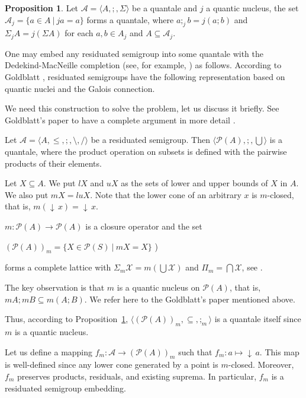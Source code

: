 \documentclass[a4paper]{article}
\theoremstyle{definition}
\theoremstyle{theorem}
\theoremstyle{proposition}
\newtheorem{proposition}{Proposition}
\theoremstyle{lemma}
\theoremstyle{ex}
\theoremstyle{corollary}
\theoremstyle{claim}
\newcommand{\down}[1]{\ensuremath{{\downarrow}\,#1}}
\begin{document}
\begin{proposition} \label{subsemi}
  Let $\mathcal{A} = \langle A, ;, \Sigma \rangle$ be a quantale and $j$ a quantic nucleus, the set
  $\mathcal{A}_j = \{ a \in A \: | \: j a = a \}$ forms a quantale, where $a ;_j b = j(a ; b)$ and $\Sigma_j A = j (\Sigma A)$ for each $a, b \in {A}_j$ and $A \subseteq \mathcal{A}_j$.
\end{proposition}

One may embed any residuated semigroup into some quantale with the Dedekind-MacNeille completion (see, for example, \cite{theunissen2007macneille}) as follows. According to Goldblatt \cite{goldblatt2006kripke}, residuated semigroups have the following representation based on quantic nuclei and the Galois connection.

We need this construction to solve the problem, let us discuss it briefly. See Goldblatt's paper to have a complete argument in more detail \cite{goldblatt2006kripke}.

Let $\mathcal{A} = \langle A, \leq, ;, \setminus, / \rangle$ be a residuated semigroup. Then $\langle \mathcal{P}(A), ;, \bigcup \rangle$ is a quantale, where the product operation on subsets is defined with the pairwise products of their elements.

Let $X \subseteq A$. We put $lX$ and $uX$ as the sets of lower and upper bounds of $X$ in $A$. We also put $m X = lu X$.
Note that the lower cone of an arbitrary $x$ is $m$-closed, that is,
$m (\down{x}) = \down{x}$.

$m : \mathcal{P}(A) \to \mathcal{P}(A)$ is a closure operator and the set

\begin{center}
$(\mathcal{P}(A))_m = \{ X \in \mathcal{P}(S) \: | \: m X = X\}$ )
\end{center}
forms a complete lattice with $\Sigma_{m} \mathcal{X} = m ( \bigcup \mathcal{X})$ and $\Pi_{m} = \bigcap \mathcal{X}$, see \cite[Theorem 7.3]{davey2002introduction}.

The key observation is that $m$ is a quantic nucleus on $\mathcal{P}(A)$, that is, $m A ; m B \subseteq m (A ; B)$. We refer here to the Goldblatt's paper mentioned above.

Thus, according to Proposition~\ref{subsemi}, $\langle (\mathcal{P}(A))_m, \subseteq, ;_m \rangle$ is a quantale itself since $m$ is a quantic nucleus.

Let us define a mapping $f_m : \mathcal{A} \to (\mathcal{P}(A))_m$ such that $f_m : a \mapsto \down{a}$. This map is well-defined since any lower cone generated by a point is $m$-closed. Moreover, $f_m$ preserves products, residuals, and existing suprema. In particular, $f_m$ is a residuated semigroup embedding.
\end{document}
